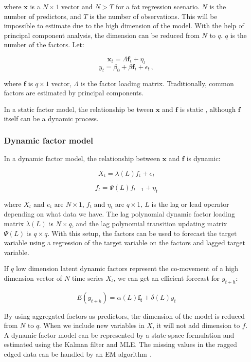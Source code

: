 where  $\mathbf x$ is a $N \times 1$ vector and $N > T$ for a fat regression scenario. $N$ is the number of predictors, and $T$ is the number of observations. This will be impossible to estimate due to the high dimension of the model. With the help of principal component analysis, the dimension can be reduced from $N$ to $q$.  $q$ is the number of the factors. Let:

$$ \mathbf x_{t} = \Lambda \mathbf f_t + \eta_t$$
$$ y_{t} =  \beta_0 +  \beta \mathbf f_{t} + \epsilon_t \,  ,$$

where $\mathbf f$ is $q\times 1$ vector, $\Lambda$ is the factor loading matrix. Traditionally, common factors are estimated by principal components. 

In a static factor model, the relationship be tween $\mathbf x$ and $\mathbf f$ is static , although $\mathbf f$ itself can be a dynamic process. 
 

\subsubsection{Dynamic factor model}

In a dynamic factor model, the relationship between $\mathbf x$ and $\mathbf f$ is dynamic:

$$X_t = \lambda (L) f_t + e_t$$

$$f_t = \Psi (L) f_{t-1} + \eta_t$$

where $X_t$ and $e_t$ are $N \times 1$, $f_t$ and $\eta_t$ are $q \times 1$, $L$ is the lag or lead operator depending on what data we have. The lag polynomial dynamic factor loading matrix  $\lambda (L)$ is $N \times q$, and the lag polynomial transition updating matrix $\Psi (L)$ is  $q \times q$. With this setup, the factors can be used to forecast the target variable using a regression of the target variable on the factors and lagged target variable. 

If $q$ low dimension latent dynamic factors represent the co-movement of a  high dimension vector of $N$ time series $ X_t$,  we can get an efficient forecast for $y_{t+h}$:

$$E(y_{t+h}) = \alpha (L) \mathbf{f_t}  + \delta (L) y_{t}$$

By using aggregated factors as predictors, the dimension of the model is reduced from $N$ to $q$. When we include new variables in $X$, it will not add dimension to  $f$. A dynamic factor model can be represented by a state-space formulation and estimated using the Kalman filter and MLE. The missing values in the ragged edged data  can be handled by an EM algorithm \cite{Stock2006} . 

